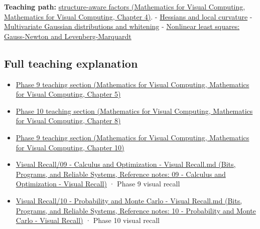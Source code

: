 \textbf{Teaching path:} \href{../02-Mathematics-for-Visual-Computing/main.pdf\#nameddest=01-foundations-i-ch020-structure-makes-a-decomposition-a-better-tool-than-generic-elimination}{structure-aware factors (Mathematics for Visual Computing, Mathematics for Visual Computing, Chapter 4)}. - \hyperref[appendix-6ac071f8b50c]{Hessians and local curvature} - \hyperref[appendix-12bbe185dbe5]{Multivariate Gaussian distributions and whitening} - \hyperref[appendix-2c2df8345991]{Nonlinear least squares: Gauss-Newton and Levenberg-Marquardt}

\subsection{Full teaching explanation}\label{appendix-50d2ea3c9b26-full-teaching-explanation}

\begin{itemize}
\tightlist
\item
  \href{../02-Mathematics-for-Visual-Computing/main.pdf\#nameddest=02-foundations-ii-ch021-jacobians-curvature-and-local-approximation}{Phase 9 teaching section (Mathematics for Visual Computing, Mathematics for Visual Computing, Chapter 5)}
\item
  \href{../02-Mathematics-for-Visual-Computing/main.pdf\#nameddest=02-foundations-ii-ch024-waiting-times-event-counts-and-covariance-geometry}{Phase 10 teaching section (Mathematics for Visual Computing, Mathematics for Visual Computing, Chapter 8)}
\item
  \href{../02-Mathematics-for-Visual-Computing/main.pdf\#nameddest=02-foundations-ii-ch026-optimization-and-inverse-problems}{Phase 9 teaching section (Mathematics for Visual Computing, Mathematics for Visual Computing, Chapter 10)}
\item
  \href{../01-Bits-Programs-and-Reliable-Systems/main.pdf\#nameddest=appendix-adf48f5dc5c1}{Visual Recall/09 - Calculus and Optimization - Visual Recall.md (Bits, Programs, and Reliable Systems, Reference notes: 09 - Calculus and Optimization - Visual Recall)} · Phase 9 visual recall
\item
  \href{../01-Bits-Programs-and-Reliable-Systems/main.pdf\#nameddest=appendix-cb5af353ef77}{Visual Recall/10 - Probability and Monte Carlo - Visual Recall.md (Bits, Programs, and Reliable Systems, Reference notes: 10 - Probability and Monte Carlo - Visual Recall)} · Phase 10 visual recall
\end{itemize}
